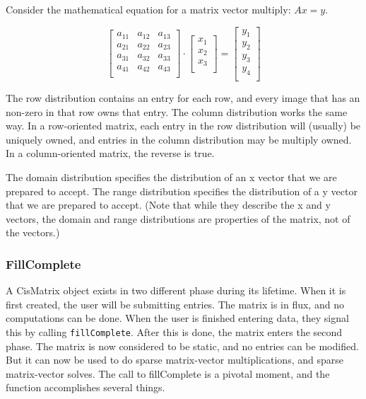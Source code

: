 \documentclass[10pt,relax]{TpetraDesign}
\begin{document}
Consider the mathematical equation for a matrix vector multiply: $Ax = y$.

\begin{equation}
\left[
\begin{array}{cccc}
a_{11} & a_{12} & a_{13}\\
a_{21} & a_{22} & a_{23}\\
a_{31} & a_{32} & a_{33}\\
a_{41} & a_{42} & a_{43}\\
\end{array}
\right]
\cdot
\left[
\begin{array}{c}
x_{1}\\
x_{2}\\
x_{3}\\
\end{array}
\right]
=
\left[
\begin{array}{c}
y_{1}\\
y_{2}\\
y_{3}\\
y_{4}\\
\end{array}
\right]
\end{equation}

The row distribution contains an entry for each row, and every image that has an non-zero in that row owns that entry. The column distribution works the same way. In a row-oriented matrix, each entry in the row distribution will (usually) be uniquely owned, and entries in the column distribution may be multiply owned. In a column-oriented matrix, the reverse is true. 

The domain distribution specifies the distribution of an x vector that we are prepared to accept. The range distribution specifies the distribution of a y vector that we are prepared to accept. (Note that while they describe the x and y vectors, the domain and range distributions are properties of the matrix, not of the vectors.)

\subsubsection*{FillComplete}
A CisMatrix object exists in two different phase during its lifetime. When it is first created, the user will be submitting entries. The matrix is in flux, and no computations can be done. When the user is finished entering data, they signal this by calling \texttt{fillComplete}. After this is done, the matrix enters the second phase. The matrix is now considered to be static, and no entries can be modified. But it can now be used to do sparse matrix-vector multiplications, and sparse matrix-vector solves. The call to fillComplete is a pivotal moment, and the function accomplishes several things.
\end{document}
